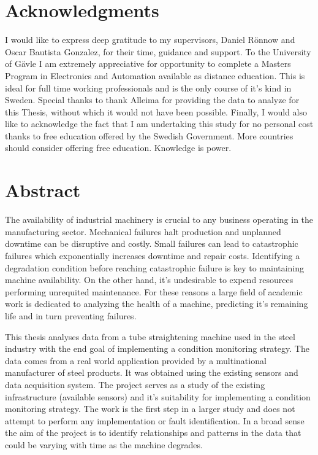 \documentclass[]{article}
\begin{document}
\setmainfont{Perpetua}

\newpage
\thispagestyle{empty}
\mbox{}
\newpage
{}

\section*{Acknowledgments}
I would like to express deep gratitude to my supervisors, Daniel Rönnow and Oscar Bautista Gonzalez, for their time, guidance and support. To the University of Gävle I am extremely appreciative for opportunity to complete a Masters Program in Electronics and Automation available as distance education. This is ideal for full time working professionals and is the only course of it's kind in Sweden. Special thanks to thank Alleima for providing the data to analyze for this Thesis, without which it would not have been possible. Finally, I would also like to acknowledge the fact that I am undertaking this study for no personal cost thanks to free education offered by the Swedish Government. More countries should consider offering free education. Knowledge is power.
\newpage

\section*{Abstract}
The availability of industrial machinery is crucial to any business operating in the manufacturing sector. Mechanical failures halt production and unplanned downtime can be disruptive and costly. Small failures can lead to catastrophic failures which exponentially increases downtime and repair costs. Identifying a degradation condition before reaching catastrophic failure is key to maintaining machine availability. On the other hand, it's undesirable to expend resources performing unrequited maintenance. For these reasons a large field of academic work is dedicated to analyzing the health of a machine, predicting it's remaining life and in turn preventing failures.

This thesis analyses data from a tube straightening machine used in the steel industry with the end goal of implementing a condition monitoring strategy. The data comes from a real world application provided by a multinational manufacturer of steel products. It was obtained using the existing sensors and data acquisition system. The project serves as a study of the existing infrastructure (available sensors) and it's suitability for implementing a condition monitoring strategy. The work is the first step in a larger study and does not attempt to perform any implementation or fault identification. In a broad sense the aim of the project is to identify relationships and patterns in the data that could be varying with time as the machine degrades.
\end{document}
